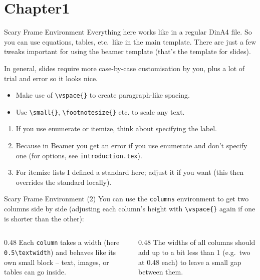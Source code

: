 \section{Chapter1}

\begin{frame}{Scary Frame Environment}
Everything here works like in a regular DinA4 file. So you can use equations, tables, etc.\ like in the main template. There are just a few tweaks important for using the beamer template (that's the template for slides).

\vspace{0.3cm}
In general, slides require more case-by-case customisation by you, plus a lot of trial and error so it looks nice. 

\begin{itemize}
    \item Make use of \texttt{\textbackslash vspace\{\}} to create paragraph-like spacing.
    \item Use \texttt{\textbackslash small\{\}}, \texttt{\textbackslash footnotesize\{\}} etc. to scale any text.
\end{itemize}

\vspace{0.3cm}

\begin{enumerate}[label=\alph*)]
    \item If you use enumerate or itemize, think about specifying the label.
    \item Because in Beamer you get an error if you use enumerate and don't specify one (for options, see \texttt{introduction.tex}).
    \item For itemize lists I defined a standard here; adjust it if you want (this then overrides the standard locally).
\end{enumerate}

\end{frame}

\begin{frame}{Scary Frame Environment (2)}
    You can use the \texttt{columns} environment to get two columns side by side (adjusting each column's height with \texttt{\textbackslash vspace\{\}} again if one is shorter than the other):

\vspace{0.3cm}

\begin{columns}
  \begin{column}{0.48\textwidth}
    Each \texttt{column} takes a width (here \texttt{0.5\textbackslash textwidth}) and behaves like its own small block -- text, images, or tables can go inside.
  \end{column}
  \begin{column}{0.48\textwidth}
    The widths of all columns should add up to a bit less than 1 (e.g.\ two at 0.48 each) to leave a small gap between them.
  \end{column}
\end{columns}

\end{frame}



